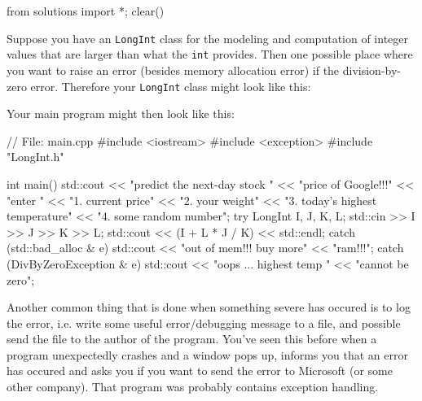 \begin{python0}
from solutions import *; clear()
\end{python0}

Suppose you have an \texttt{LongInt} class for the modeling and
computation of integer values that are larger than what the \texttt{int}
provides. Then one possible place where you want to raise an error
(besides memory allocation error) if the division-by-zero error.
Therefore your \texttt{LongInt} class might look like this:


Your main program might then look like this:

\begin{console}
// File: main.cpp
#include <iostream>
#include <exception>
#include "LongInt.h"

int main()
{   
    std::cout << "predict the next-day stock "
    << "price of Google!!!\n"
    << "enter \n"
    << "1. current price\n"
    << "2. your weight\n"
    << "3. today's highest temperature\n"
    << "4. some random number\n";
    try
    {
        LongInt I, J, K, L;
        std::cin >> I >> J >> K >> L;
        std::cout << (I + L * J / K) << std::endl;
    }
    catch (std::bad_alloc & e)
    {
        std::cout << "out of mem!!! buy more"
                  << "ram!!!\n";
    }
    catch (DivByZeroException & e)
    {
        std::cout << "oops ... highest temp "
        << "cannot be zero\n";
    }
}
\end{console}

Another common thing that is done when something severe has occured is
to log the error, i.e. write some useful error/debugging message to a
file, and possible send the file to the author of the program.
You've seen this before when a program unexpectedly
crashes and a window pops up, informs you that an error has occured and
asks you if you want to send the error to Microsoft (or some other
company). That program was probably contains exception handling.

